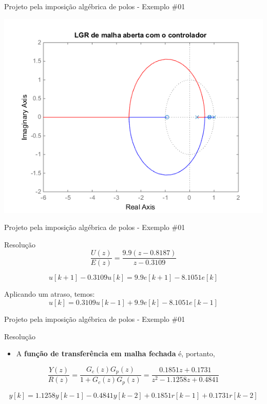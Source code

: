\begin{frame}{Projeto pela imposição algébrica de polos - Exemplo \#01}
\centerline{\includegraphics[width=0.8\linewidth]{Figuras/Ch11/fig11.png}}
\end{frame}

\begin{frame}{Projeto pela imposição algébrica de polos - Exemplo \#01}
\begin{block}{Resolução}
$$\dfrac{U(z)}{E(z)}=\dfrac{\num{9,9}(z-\num{0,8187})}{z-\num{0,3109}}$$

$$u[k+1] - \num{0,3109} u[k]=\num{9,9}e[k+1]-\num{8,1051}e[k]$$

Aplicando um atraso, temos:\\
$$u[k]=\num{0,3109}u[k-1]+\num{9,9}e[k]-\num{8,1051}e[k-1]$$
\end{block}
\end{frame}

\begin{frame}{Projeto pela imposição algébrica de polos - Exemplo \#01}
\begin{block}{Resolução}
\begin{itemize}
    \item A \textbf{função de transferência em malha fechada} é, portanto,
\end{itemize}
$$\dfrac{Y(z)}{R(z)}=\dfrac{G_c(z)G_p(z)}{1+G_c(z)G_p(z)}=\dfrac{\num{0,1851}z+\num{0,1731}}{z^{2}-\num{1,1258}z+\num{0,4841}}$$

$$y[k]=\num{1,1258}y[k-1]-\num{0,4841}y[k-2]+\num{0,1851}r[k-1]+\num{0,1731}r[k-2]$$
\end{block}
\end{frame}


